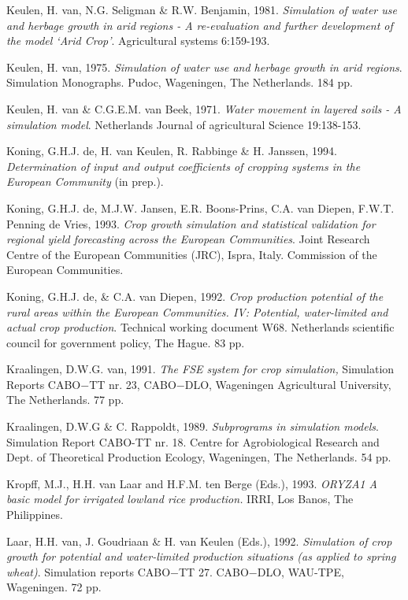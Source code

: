 Keulen, H. van, N.G. Seligman \& R.W. Benjamin, 1981. {\it Simula\-tion of water use and herbage
growth in arid\/} {\it regions - A re-evaluation and further development of the model `Arid Crop'\/}.
Agricultural systems 6:159-193.

Keulen, H. van, 1975. {\it Simulation of water use and herbage growth in arid regions\/}. Simulation
Monographs. Pudoc, Wageningen, The Netherlands. 184 pp.

Keulen, H. van \& C.G.E.M. van Beek, 1971. {\it Water movement in layered soils - A simulation model\/}.
Netherlands Journal of agricultural Science 19:138-153.

Koning, G.H.J. de, H. van Keulen, R. Rabbinge \& H. Janssen, 1994. {\it Determination of input and
output coefficients of cropping systems in the European Community\/} (in prep.).

Koning, G.H.J. de, M.J.W. Jansen, E.R. Boons-Prins, C.A. van Diepen, F.W.T. Penning de Vries,
1993. {\it Crop growth simulation and statistical validation for regional yield forecasting across the
European Communities\/}. Joint Research Centre of the European Communities (JRC), Ispra, Italy.
Commission of the European Communities.

Koning, G.H.J. de, \& C.A. van Diepen, 1992. {\it Crop production potential of the rural areas within
the European Commun\-ities. IV: Potential, water-limited and actual crop production\/}. Technical
working document W68. Netherlands scientific council for government policy, The Hague. 83 pp.

Kraalingen, D.W.G. van, 1991. {\it The FSE system for crop simulation,\/} Simulation Reports CABO$-$TT
nr. 23, CABO$-$DLO, Wageningen Agricultural University, The Netherlands. 77 pp. 

Kraalingen, D.W.G \& C. Rappoldt, 1989. {\it Subprograms in simulation models\/}. Simulation Report
CABO-TT nr. 18. Centre for Agrobiological Research and Dept. of Theoretical Production Ecology,
Wageningen, The Netherlands. 54 pp.

Kropff, M.J., H.H. van Laar and H.F.M. ten Berge (Eds.), 1993. {\it ORYZA1 A basic model for
irrigated lowland rice production.\/} IRRI, Los Banos, The Philippines.

Laar, H.H. van, J. Goudriaan \& H. van Keulen (Eds.), 1992. {\it Simula\-tion of crop growth for
potential and water-limited production situations (as applied to spring wheat)\/}. Simulation reports
CABO$-$TT 27. CABO$-$DLO, WAU-TPE, {\nobreak}Wageningen. 72 pp.

